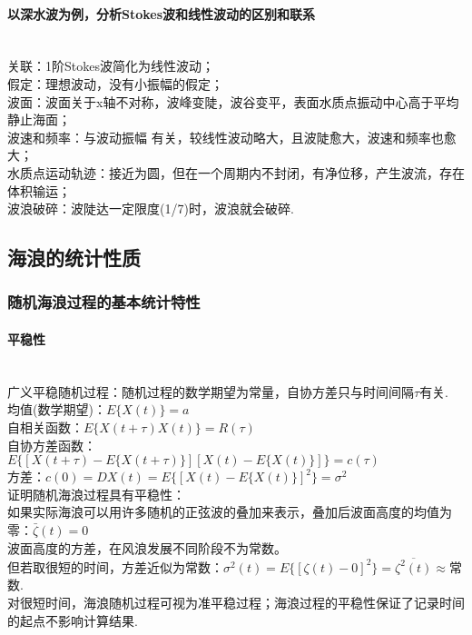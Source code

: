 \documentclass[a4paper,12pt]{article}
\begin{document}
    \paragraph{以深水波为例，分析Stokes波和线性波动的区别和联系}~{}\\
    关联：1阶Stokes波简化为线性波动；\\
    假定：理想波动，没有小振幅的假定；\\
    波面：波面关于x轴不对称，波峰变陡，波谷变平，表面水质点振动中心高于平均静止海面；\\
    波速和频率：与波动振幅 有关，较线性波动略大，且波陡愈大，波速和频率也愈大；\\
    水质点运动轨迹：接近为圆，但在一个周期内不封闭，有净位移，产生波流，存在体积输运；\\
    波浪破碎：波陡达一定限度(1/7)时，波浪就会破碎.
    \subsection{海浪的统计性质}
    \subsubsection{随机海浪过程的基本统计特性}
    \paragraph{平稳性}~{}\\
    广义平稳随机过程：随机过程的数学期望为常量，自协方差只与时间间隔$\tau$有关.\\
    均值(数学期望)：$E\{X(t)\}=a$\\
    自相关函数：$E\{X(t+\tau)X(t)\}=R(\tau)$\\
    自协方差函数：$E\{[X(t+\tau)-E\{X(t+\tau)\}][X(t)-E\{X(t)\}]\}=c(\tau)$\\
    方差：$c(0)=DX(t)=E\{[X(t)-E\{X(t)\}]^2\}=\sigma^2$\\
    证明随机海浪过程具有平稳性：\\
    如果实际海浪可以用许多随机的正弦波的叠加来表示，叠加后波面高度的均值为零：$\displaystyle \bar{\zeta}(t)=0$\\
    波面高度的方差，在风浪发展不同阶段不为常数。\\
    但若取很短的时间，方差近似为常数：$\displaystyle \sigma^2(t)=E\{[\zeta(t)-0]^2\}=\overline{\zeta^2(t)}\approx$常数.\\
    对很短时间，海浪随机过程可视为准平稳过程；海浪过程的平稳性保证了记录时间的起点不影响计算结果.\\
\end{document}
